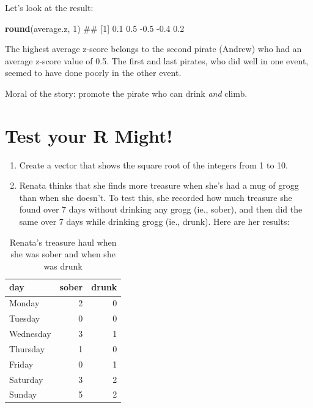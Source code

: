 \documentclass[]{book}
\newenvironment{Shaded}{\begin{snugshade}}{\end{snugshade}}
\newcommand{\KeywordTok}[1]{\textcolor[rgb]{0.13,0.29,0.53}{\textbf{{#1}}}}
\newcommand{\DecValTok}[1]{\textcolor[rgb]{0.00,0.00,0.81}{{#1}}}
\newcommand{\NormalTok}[1]{{#1}}
\theoremstyle{definition}
\theoremstyle{definition}
\theoremstyle{remark}
\begin{document}
Let's look at the result:

\begin{Shaded}
\begin{Highlighting}[]
\KeywordTok{round}\NormalTok{(average.z, }\DecValTok{1}\NormalTok{)}
\NormalTok{## [1]  0.1  0.5 -0.5 -0.4  0.2}
\end{Highlighting}
\end{Shaded}

The highest average z-score belongs to the second pirate (Andrew) who
had an average z-score value of 0.5. The first and last pirates, who did
well in one event, seemed to have done poorly in the other event.

Moral of the story: promote the pirate who can drink \emph{and} climb.

\section{Test your R Might!}\label{test-your-r-might-2}

\begin{enumerate}
\def\labelenumi{\arabic{enumi}.}
\item
  Create a vector that shows the square root of the integers from 1 to
  10.
\item
  Renata thinks that she finds more treasure when she's had a mug of
  grogg than when she doesn't. To test this, she recorded how much
  treasure she found over 7 days without drinking any grogg (ie.,
  sober), and then did the same over 7 days while drinking grogg (ie.,
  drunk). Here are her results:
\end{enumerate}

\begin{table}

\caption{\label{tab:unnamed-chunk-127}Renata's treasure haul when she was sober and when she was drunk}
\centering
\begin{tabular}[t]{l|r|r}
\hline
day & sober & drunk\\
\hline
Monday & 2 & 0\\
\hline
Tuesday & 0 & 0\\
\hline
Wednesday & 3 & 1\\
\hline
Thursday & 1 & 0\\
\hline
Friday & 0 & 1\\
\hline
Saturday & 3 & 2\\
\hline
Sunday & 5 & 2\\
\hline
\end{tabular}
\end{table}
\end{document}
